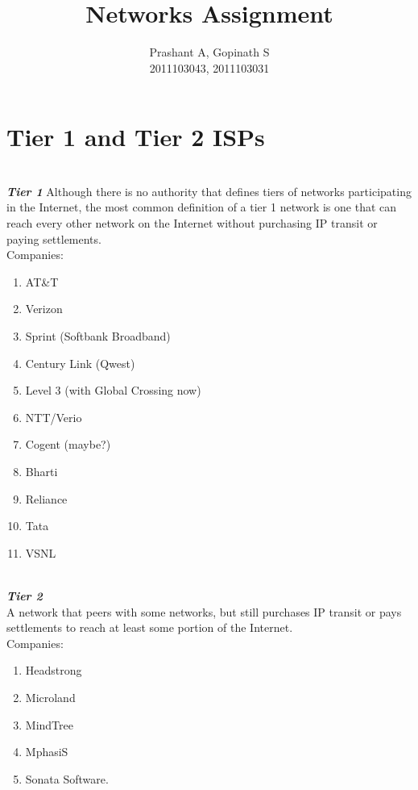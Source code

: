 \documentclass[20pt]{article}
\begin{document}
\title{Networks Assignment}
\author
{
	{Prashant A, Gopinath S\\
	2011103043, 2011103031}
}
\maketitle
\section{Tier 1 and Tier 2 ISPs}
\\\textbf{\emph{Tier 1}}
Although there is no authority that defines tiers of networks participating in the Internet, the most common definition of a tier 1 network is one that can reach every other network on the Internet without purchasing IP transit or paying settlements.
\\Companies:
\begin{enumerate}
	\\\item{AT&T}
	\\\item{Verizon}
	\\\item{Sprint (Softbank Broadband)}
	\\\item{Century Link (Qwest)}
	\\\item{Level 3 (with Global Crossing now)}
	\\\item{NTT/Verio}
	\\\item{Cogent (maybe?)}
	\\\item{Bharti}
	\\\item{Reliance}
	\\\item{Tata}
	\\\item{VSNL}
\end{enumerate}
\\\textbf{\emph{Tier 2}}
\\A network that peers with some networks, but still purchases IP transit or pays settlements to reach at least some portion of the Internet.
\\Companies:
\begin{enumerate}
	\\\item{Headstrong} \\\item{Microland} \\\item{MindTree} \\\item{MphasiS }\\\item{Sonata Software. }
\end{enumerate}
\end{document}
